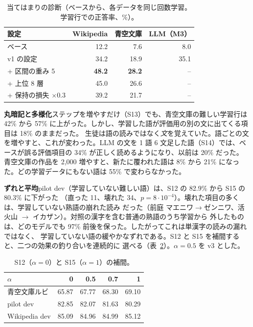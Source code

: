 \documentclass[10pt,a4paper,twocolumn]{article}
\begin{document}
\begin{table}[t]
\centering\footnotesize
\caption{当てはまりの診断（ベースから、各データを同じ回数学習。学習行での正答率、\%）。}
\label{tab:diag}
\begin{tabular}{@{}lrrr@{}}
\toprule
設定 & Wikipedia & 青空文庫 & LLM（M3）\\
\midrule
ベース & 12.2 & 7.6 & 8.0\\
v1 の設定 & 34.2 & 18.9 & 35.1\\
+ 区間の重み 5 & \textbf{48.2} & \textbf{28.2} & --\\
+ 上位 8 層 & 45.0 & 26.6 & --\\
+ 保持の損失 $\times0.3$ & 39.2 & 21.7 & --\\
\bottomrule
\end{tabular}
\end{table}

\textbf{丸暗記と多様化}\label{sec:variety}\quad ステップを増やすだけ（S13）でも、青空文庫の難しい学習行は
42\% から 57\% に上がった。しかし、学習した語が評価用の別の文に出てくる項目は 18\% のままだった。
生徒は語の読みではなく\emph{文}を覚えていた。語ごとの文を増やすと、これが変わった。LLM の文を 1 語
6 文足した語（S14）では、ベースが誤る評価項目の 34\% が正しく読めるようになり、以前は 20\% だった。
青空文庫の作品を 2,000 増やすと、新たに覆われた語は 8\% から 21\% になった。どの学習データにもない語は
55\% で変わらなかった。

\textbf{ずれと平均}\quad pilot dev（学習していない難しい語）は、S12 の 82.9\% から S15 の 80.3\% に下がった
（直った 11、壊れた 34、$p=8\cdot10^{-4}$）。壊れた項目の多くは、学習していない熟語の崩れた読み
だった（前庭 マエニワ$\to$ゼンニワ、活火山 $\to$ イカザン）。対照の漢字を含む普通の熟語のうち学習から
外したものは、どのモデルでも 97\% 前後を保った。したがってこれは単漢字の読みの漏れではなく、
学習していない語の緩やかなずれである。S12 と S15 を補間すると、二つの効果の釣り合いを連続的に
選べる（表~\ref{tab:interp}）。$\alpha=0.5$ を v3 とした。

\begin{table}[t]
\centering\footnotesize
\caption{S12（$\alpha{=}0$）と S15（$\alpha{=}1$）の補間。}
\label{tab:interp}
\begin{tabular}{@{}lrrrr@{}}
\toprule
$\alpha$ & 0 & 0.5 & 0.7 & 1\\
\midrule
青空文庫ルビ & 65.87 & 67.77 & 68.30 & 69.10\\
pilot dev & 82.85 & 82.07 & 81.63 & 80.29\\
Wikipedia dev & 85.09 & 84.96 & 84.99 & 85.12\\
\bottomrule
\end{tabular}
\end{table}
\end{document}
